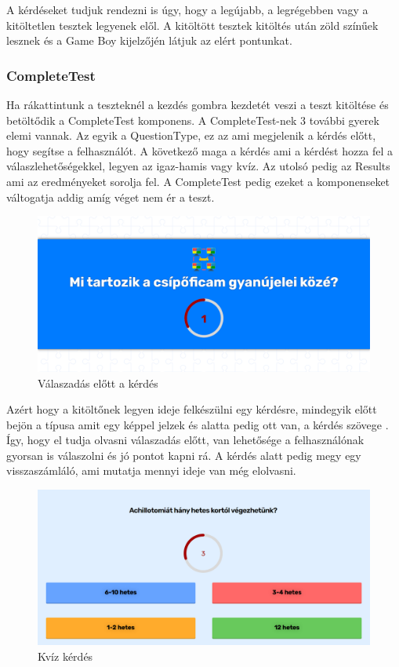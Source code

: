 A kérdéseket tudjuk rendezni is úgy, hogy a legújabb, a legrégebben vagy a kitöltetlen tesztek legyenek elől.
A kitöltött tesztek kitöltés után zöld színűek lesznek és a Game Boy kijelzőjén látjuk az elért pontunkat.

\subsubsection{CompleteTest}

Ha rákattintunk a teszteknél a kezdés gombra kezdetét veszi a teszt kitöltése és betöltődik a CompleteTest komponens. A CompleteTest-nek 3 további gyerek elemi vannak. Az egyik a QuestionType, ez az ami megjelenik a kérdés előtt, hogy segítse a felhasználót. A következő maga a kérdés ami a kérdést hozza fel a válaszlehetőségekkel, legyen az igaz-hamis vagy kvíz. Az utolsó pedig az Results ami az eredményeket sorolja fel. A CompleteTest pedig ezeket a komponenseket váltogatja addig amíg véget nem ér a teszt.

\begin{figure}[H]
    \centering
    \includegraphics[width=\linewidth]{images/question_type.png}
    \caption{Válaszadás előtt a kérdés}
    \label{fig:question_type}
\end{figure}

Azért hogy a kitöltőnek legyen ideje felkészülni egy kérdésre, mindegyik előtt bejön a típusa amit egy képpel jelzek és alatta pedig ott van, a kérdés szövege . Így, hogy el tudja olvasni válaszadás előtt, van lehetősége a felhasználónak gyorsan is válaszolni és jó pontot kapni rá. A kérdés alatt pedig megy egy visszaszámláló, ami mutatja mennyi ideje van még elolvasni.

\begin{figure}[H]
    \centering
    \includegraphics[width=\linewidth]{images/question1.png}
    \caption{Kvíz kérdés}
    \label{fig:question1}
\end{figure}

